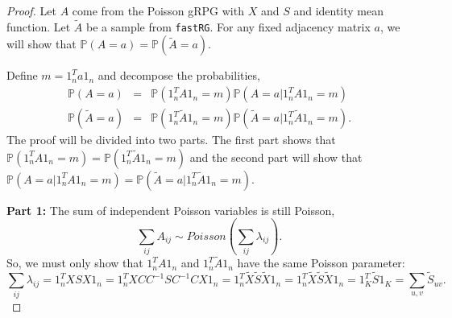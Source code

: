 \documentclass[twoside,11pt]{article}
\begin{document}
\begin{proof}
Let $A$ come from the Poisson gRPG with $X$ and $S$ and identity mean function.  Let $\tilde A$ be a sample from \texttt{fastRG}.   For any fixed adjacency matrix $a$, we will show that $\mathbb{P}(A = a)=\mathbb{P}(\tilde A = a)$.

Define $m = 1_n^Ta1_n$ and decompose the probabilities,
\begin{eqnarray}
\mathbb{P}(A = a) &=& \mathbb{P}(1_n^T A 1_n =m) \mathbb{P}(A=a| 1_n^T A 1_n =m) \\
\mathbb{P}(\tilde A = a) &=& \mathbb{P}(1_n^T \tilde A 1_n =m) \mathbb{P}(\tilde A=a| 1_n^T \tilde A 1_n =m).
\end{eqnarray}
The proof will be divided into two parts.  The first part shows that $\mathbb{P}(1_n^T A 1_n =m) = \mathbb{P}(1_n^T \tilde A 1_n =m)$ and the second part will show that  $\mathbb{P}(A=a| 1_n^T A 1_n =m) = \mathbb{P}(\tilde A=a| 1_n^T \tilde A 1_n =m)$.

\textbf{Part 1:} 
The sum of independent Poisson variables is still Poisson, 
\[\sum_{ij} A_{ij} \sim Poisson(\sum_{ij}\lambda_{ij}).\]  
So, we must only show that $1_n^T A 1_n$ and $1_n^T \tilde A 1_n$ have the same Poisson parameter:
\[\sum_{ij}\lambda_{ij} = 1_n^T X S X 1_n  =  1_n^T XC C^{-1} S C^{-1} C X 1_n  =  1_n^T \tilde X\tilde S \tilde X 1_n  =  1_n^T \tilde X\tilde S \tilde X 1_n  =  1_K^T \tilde S 1_K  =  \sum_{u,v} \tilde S_{uv}.\]





\end{proof}
\end{document}
